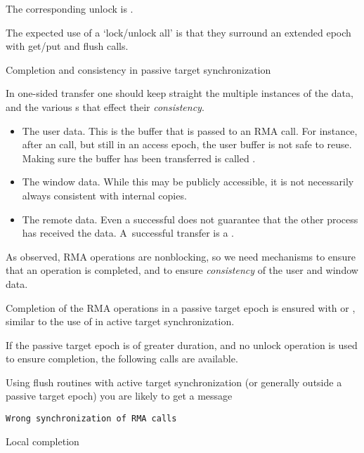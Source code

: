 The corresponding unlock is
.

The expected use of a `lock/unlock all' is that they surround
an extended epoch with get/put and flush calls.

 {Completion and consistency in passive target synchronization}

In one-sided transfer one should keep straight the multiple instances
of the data, and the various s that effect
their \emph{consistency}.
\begin{itemize}
\item The user data. This is the buffer that is passed to an RMA call.
  For instance, after an  call, but still in an
  access epoch, the user buffer is not safe to reuse. Making sure the
  buffer has been transferred is called .
\item The window data. While this may be publicly accessible, it is
  not necessarily always consistent with internal copies.
\item The remote data. Even a successful  does not guarantee
  that the other process has received the data. A~successful transfer
  is a .
\end{itemize}

As observed, \ac{RMA} operations are nonblocking, so we need
mechanisms to ensure that an operation is completed,
and to ensure \emph{consistency} of the
user and window data.

Completion of the \ac{RMA} operations in a  passive target epoch
is ensured with
 or ,
similar to the use of 
in active target synchronization.

If the passive target epoch is of greater duration,
and no unlock operation is used to ensure completion,
the following calls are available.

\begin{remark}
  Using flush routines with active target synchronization
  (or generally outside a passive target epoch) you are
  likely to get a message
\begin{verbatim}
Wrong synchronization of RMA calls
\end{verbatim}
\end{remark}

 {Local completion}

